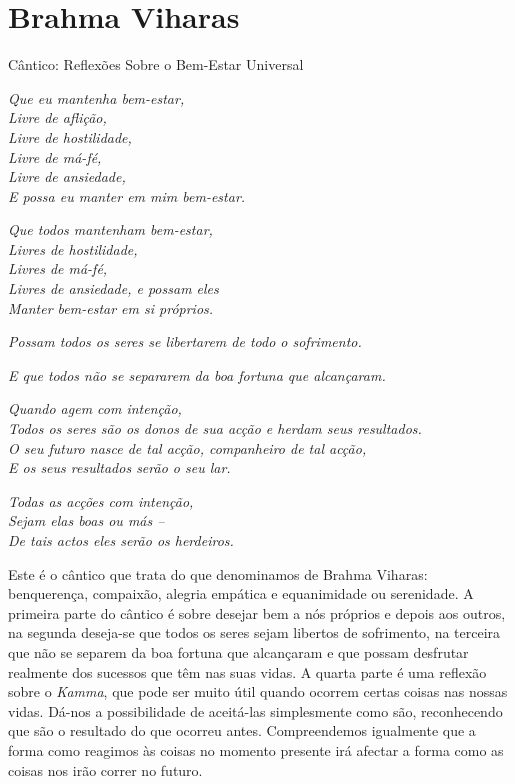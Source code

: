 \chapter{Brahma Viharas}

{\centering\sectionSize
Cântico: Reflexões Sobre o Bem-Estar Universal
\par}


{\setlength{\parskip}{0.5\baselineskip}%
\setlength{\parindent}{0pt}%

\itshape
Que eu mantenha bem-estar,\\
Livre de aflição,\\
Livre de hostilidade,\\
Livre de má-fé,\\
Livre de ansiedade,\\
E possa eu manter em mim bem-estar.

\itshape
Que todos mantenham bem-estar,\\
Livres de hostilidade,\\
Livres de má-fé,\\
Livres de ansiedade, e possam eles\\
Manter bem-estar em si próprios.

\itshape
Possam todos os seres se libertarem de todo o sofrimento.

\itshape
E que todos não se separarem da boa fortuna que alcançaram.

\itshape
Quando agem com intenção,\\
Todos os seres são os donos de sua acção e herdam seus resultados.\\
O seu futuro nasce de tal acção, companheiro de tal acção,\\
E os seus resultados serão o seu lar.

\itshape
Todas as acções com intenção,\\
Sejam elas boas ou más --\\
De tais actos eles serão os herdeiros.

}

\bigskip

Este é o cântico que trata do que denominamos de Brahma Viharas:
benquerença, compaixão, alegria empática e equanimidade ou serenidade. A
primeira parte do cântico é sobre desejar bem a nós próprios e depois
aos outros, na segunda deseja-se que todos os seres sejam libertos de
sofrimento, na terceira que não se separem da boa fortuna que alcançaram
e que possam desfrutar realmente dos sucessos que têm nas suas vidas. A
quarta parte é uma reflexão sobre o \emph{Kamma}, que pode ser muito
útil quando ocorrem certas coisas nas nossas vidas. Dá-nos a
possibilidade de aceitá-las simplesmente como são, reconhecendo que são
o resultado do que ocorreu antes. Compreendemos igualmente que a forma
como reagimos às coisas no momento presente irá afectar a forma como as
coisas nos irão correr no futuro.

